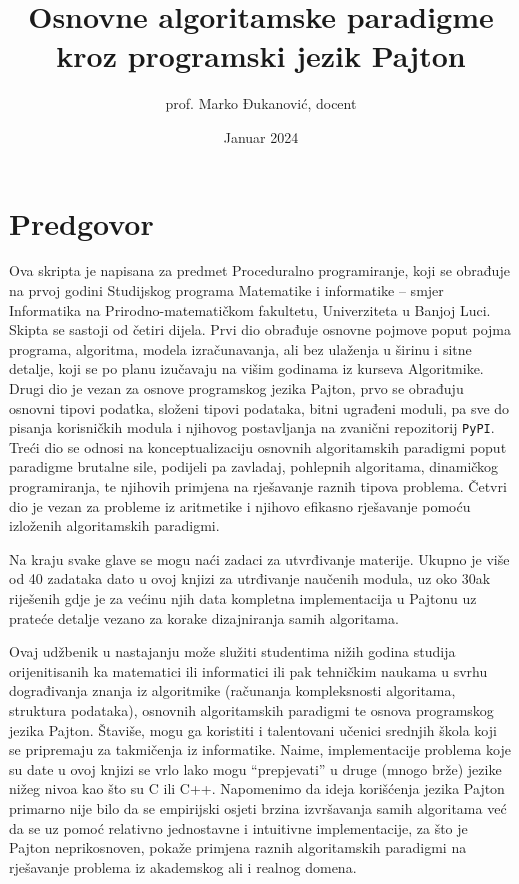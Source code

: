 \documentclass[b4paper,12pt]{book}
\begin{document}
\author{prof. Marko Đukanović, docent}
\title{Osnovne algoritamske paradigme kroz programski jezik Pajton}
\date{Januar 2024}

 
\maketitle
 
\tableofcontents
 \clearpage
 \setcounter{page}{1}

\chapter*{Predgovor}

Ova skripta je napisana za predmet Proceduralno programiranje, koji se obrađuje na prvoj godini Studijskog programa Matematike i informatike -- smjer Informatika na Prirodno-matematičkom fakultetu, Univerziteta u Banjoj Luci. Skipta se sastoji od četiri dijela. Prvi dio obrađuje osnovne pojmove poput pojma programa, algoritma, modela izraču\-navanja, ali bez ulaženja u širinu i sitne detalje, koji se po planu izučavaju na višim godinama iz kurseva Algoritmike. Drugi dio je vezan za osnove programskog jezika Pajton, prvo se obrađuju  osnovni tipovi podatka, složeni tipovi podataka, bitni ugrađeni moduli, pa sve do pisanja korisničkih modula i njihovog postavljanja na zvanični repozitorij \texttt{PyPI}. Treći dio se odnosi na konceptualizaciju osnovnih algoritamskih paradigmi poput paradigme brutalne sile, podijeli pa zavladaj, pohlepnih algoritama, dinamičkog programiranja, te njihovih primjena na rješavanje raznih tipova problema. Četvri dio je vezan za probleme iz aritmetike i njihovo efikasno rješavanje pomoću izloženih algoritamskih paradigmi. 

 Na kraju svake glave se mogu naći zadaci za utvrđivanje materije. Ukupno je više od 40 zadataka dato u ovoj knjizi za utrđivanje naučenih modula, uz oko 30ak riješenih gdje je za većinu njih data kompletna implementacija u Pajtonu uz prateće detalje vezano za korake dizajniranja samih algoritama. 
 
 
 Ovaj udžbenik u nastajanju može služiti studentima nižih godina studija orijenitisanih ka matematici ili informatici ili pak tehničkim naukama u svrhu dograđivanja znanja iz algoritmike (računanja kompleksnosti algoritama, struktura podataka), osnovnih algoritamskih paradigmi te osnova programskog jezika Pajton. Štaviše, mogu ga koristiti i talentovani učenici srednjih škola koji se pripremaju za takmičenja iz informatike. Naime, implementacije problema koje su date u ovoj knjizi se vrlo lako mogu ``prepjevati'' u druge (mnogo brže) jezike nižeg nivoa kao što su C ili C++. Napomenimo da ideja korišćenja jezika Pajton primarno nije bilo da se empirijski osjeti brzina izvršavanja samih algoritama već da se uz pomoć relativno jednostavne i intuitivne implementacije, za što je Pajton neprikosnoven, pokaže primjena raznih algoritamskih paradigmi na rješavanje problema iz akademskog ali i realnog domena.
\end{document}
